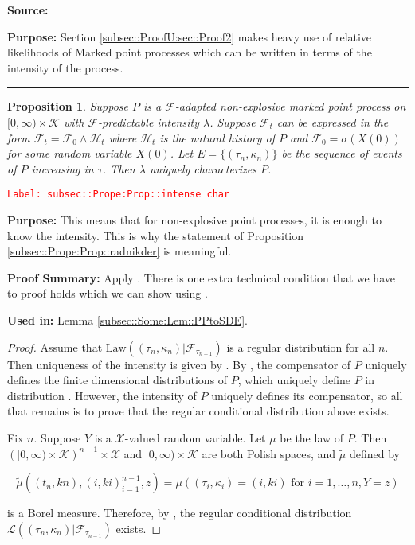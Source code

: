 \documentclass[12pt]{article}
\newcommand{\mc}{\mathcal}
\newcommand{\ms}{\mathscr}
\newcommand{\te}{\text}
\newcommand{\tr}{\textcolor{red}}
\newcommand{\labe}[1]{\tr{\texttt{Label: #1}}}
\newcommand{\purpose}{\textbf{Purpose: }}
\newcommand{\pfsum}{\textbf{Proof Summary: }}
\newcommand{\usein}{\textbf{Used in: }}
\newcommand{\ind}{\hspace{24pt}}
\newcommand{\lin}{\rule{\linewidth}{0.4 pt}}
\renewcommand{\t}{t}							%
\newcommand{\F}{\mc{F}}							%
\newcommand{\FH}{\mc{H}}						%
\newcommand{\X}{X}								%
\newcommand{\tp}[1]{(#1)}						%
\newcommand{\ts}[1]{_{#1}}						%
\newcommand{\rate}{\lambda}						%
\newcommand{\alt}[1]{\widetilde{#1}}			%
\newcommand{\indx}[1]{_{#1}}					%
\newcommand{\m}{\mu}							%
\newcommand{\law}{\te{Law}}						%
\newcommand{\XX}{Y}								%
\newcommand{\rt}{\tau}							%
\renewcommand{\mark}{\kappa}					%
\newcommand{\rp}{P}								%
\newcommand{\spce}{\mc{X}}						%
\newcommand{\xxx}{z}							%
\newcommand{\mspce}{\mc{K}}						%
\newtheorem{prop}[thms]{Proposition}
\begin{document}
\textbf{Source: }\cite[Definition 14.3.I]{DalVer08}

\purpose Section \ref{subsec::ProofU:sec::Proof2} makes heavy use of relative likelihoods of Marked point processes which can be written in terms of the intensity of the process.

\lin

\begin{prop}
Suppose \(\rp\) is a \(\F\)-adapted non-explosive marked point process on \([0,\infty)\times \mspce\) with \(\F\)-predictable intensity \(\rate\). Suppose \(\F\ts{\t}\) can be expressed in the form \(\F\ts{\t} = \F\ts{0}\wedge \FH\ts{\t}\) where \(\FH\ts{\t}\) is the natural history of \(\rp\) and \(\F\ts{0} = \sigma(\X\tp{0})\) for some random variable \(\X\tp{0}\). Let \(E = \{(\rt\indx{n},\mark\indx{n})\}\) be the sequence of events of \(\rp\) increasing in \(\rt\). Then \(\rate\) uniquely characterizes \(\rp\).
\label{subsec::Prope:Prop::intense char}
\end{prop}
\labe{subsec::Prope:Prop::intense char}

\purpose This means that for non-explosive point processes, it is enough to know the intensity. This is why the statement of Proposition \ref{subsec::Prope:Prop::radnikder} is meaningful.

\pfsum Apply \cite[Propositions 14.3.II(b),14.2.IV(c) and 9.2.III]{DalVer08}. There is one extra technical condition that we have to proof holds which we can show using \cite[Proposition A1.5.III]{DalVer03}.

\usein Lemma \ref{subsec::Some:Lem::PPtoSDE}.

\begin{proof}
Assume that \(\law((\rt\indx{n},\mark\indx{n})|\F\ts{\rt\indx{n-1}})\) is a regular distribution for all \(n\). Then uniqueness of the intensity is given by \cite[Proposition 14.3.II (b)]{DalVer08}. By \cite[Proposition 14.2.IV (c)]{DalVer08}, the compensator of \(\rp\) uniquely defines the finite dimensional distributions of \(\rp\), which uniquely define \(\rp\) in distribution \cite[Proposition 9.2.III]{DalVer08}. However, the intensity of \(\rp\) uniquely defines its compensator, so all that remains is to prove that the regular conditional distribution above exists.

\ind Fix \(n\). Suppose \(\XX\) is a \(\spce\)-valued random variable. Let \(\m\) be the law of \(\rp\). Then \(\left([0,\infty)\times \mspce\right)^{n-1}\times\spce\) and \([0,\infty)\times \mspce\) are both Polish spaces, and \(\alt{\m}\) defined by 

\[\alt{\m}((\t\indx{n},k{n}),(	{i},k{i})_{i=1}^{n-1},\xxx) = \m\left((\rt\indx{i},\mark\indx{i}) = (	{i},k{i})\te{ for } i=1,\dots,n, \XX = \xxx\right)\]

is a Borel measure. Therefore, by \cite[Proposition A1.5.III]{DalVer03}, the regular conditional distribution \(\ms{L}((\rt\indx{n},\mark\indx{n})|\F\ts{\rt\indx{n-1}})\) exists.
\end{proof}
\end{document}
